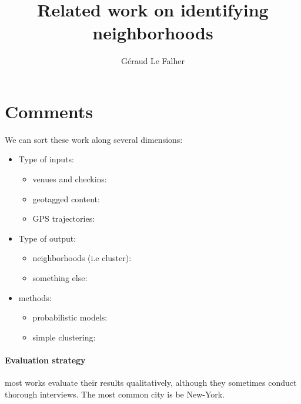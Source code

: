 \documentclass[a4paper,final,notitlepage,11pt,svgnames]{scrartcl}
\title{Related work on identifying neighborhoods}
\author{Géraud Le Falher}
\begin{document}
\maketitle

\section*{Comments}

We can sort these work along several dimensions:
\begin{itemize}
	\item Type of inputs:
		\begin{itemize}
			\item venues and checkins: \autocites{cranshaw2010seeing}{UrbanStory12}{Livehoods12}{Hoodsquare13}{ICWSM1510580}
			\item geotagged content:
				\autocites[photos][]{Kafsi2015}[tweets][]{spectralLandUseTwitter14}[photos and tags][]{NonGaussianTopicKling14}[phone calls][]{CompareCitiesPhone15}
			\item GPS trajectories: \autocites{zoneTrajectories15}{taxiChina15}
		\end{itemize}
	\item Type of output:
		\begin{itemize}
			\item neighborhoods (i.e cluster): \autocites{Livehoods12}{Hoodsquare13}{ICWSM1510580}{spectralLandUseTwitter14}{zoneTrajectories15}{taxiChina15}{CompareCitiesPhone15}
			\item something else: \autocites{cranshaw2010seeing}{UrbanStory12}{Kafsi2015}{NonGaussianTopicKling14}
		\end{itemize}
	\item methods:
		\begin{itemize}
			\item probabilistic models: \autocites{cranshaw2010seeing}{UrbanStory12}{Kafsi2015}{NonGaussianTopicKling14}
			\item simple clustering: \autocites{Livehoods12}{Hoodsquare13}{ICWSM1510580}{spectralLandUseTwitter14}{zoneTrajectories15}{taxiChina15}{CompareCitiesPhone15}
		\end{itemize}
\end{itemize}

\paragraph{Evaluation strategy} most works evaluate their results
qualitatively, although they sometimes conduct thorough interviews. The most
common city is be New-York.
\end{document}
